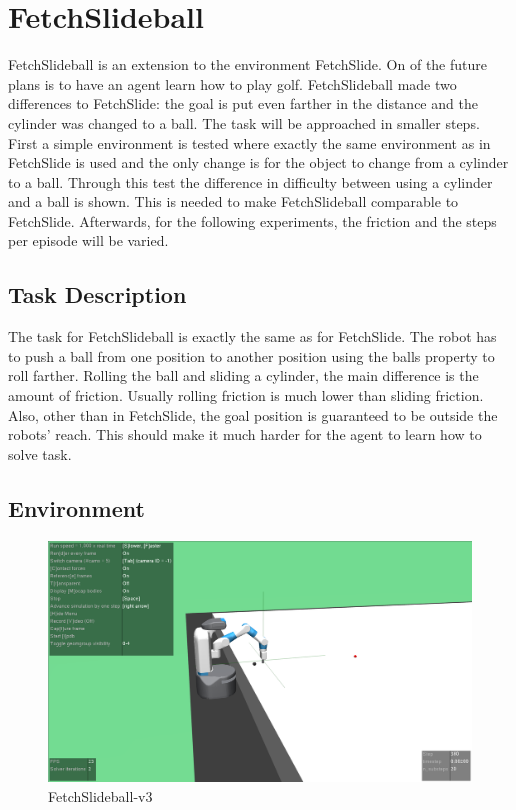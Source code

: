 \section{FetchSlideball}

FetchSlideball is an extension to the environment FetchSlide. On of the future plans is to have an agent learn how to play golf. FetchSlideball made two differences to FetchSlide: the goal is put even farther in the distance and the cylinder was changed to a ball.
The task will be approached in smaller steps. 
First a simple environment is tested where exactly the same environment as in FetchSlide is used and the only change is for the object to change from a cylinder to a ball. Through this test the difference in difficulty between using a cylinder and a ball is shown. This is needed to make FetchSlideball comparable to FetchSlide. 
Afterwards, for the following experiments, the friction and the steps per episode will be varied. 

\subsection{Task Description}

The task for FetchSlideball is exactly the same as for FetchSlide. The robot has to push a ball from one position to another position using the balls property to roll farther. Rolling the ball and sliding a cylinder, the main difference is the amount of friction. Usually rolling friction is much lower than sliding friction. 
Also, other than in FetchSlide, the goal position is guaranteed to be outside the robots' reach. This should make it much harder for the agent to learn how to solve task.


\subsection{Environment}

\begin{figure} [h]
	
	\centering
	\includegraphics[width=1\textwidth]{figures/FetchSlideball-v3.png}
	\caption{FetchSlideball-v3}
	
\end{figure}

